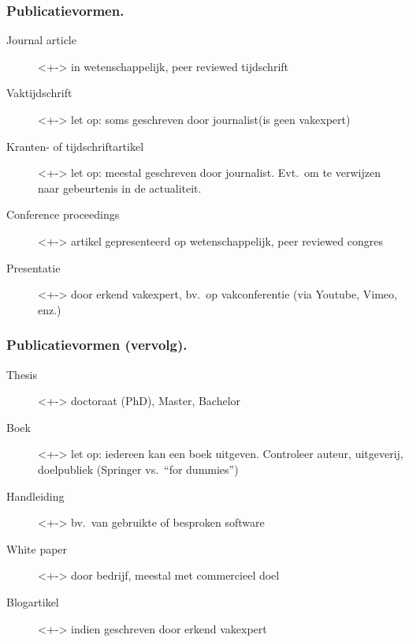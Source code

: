 \documentclass[aspectratio=169]{beamer}
\begin{document}
\begin{frame}
  \frametitle{Publicatievormen.}

  \begin{description}
    \item[Journal article]<+-> in wetenschappelijk, peer reviewed tijdschrift
    \item[Vaktijdschrift]<+-> let op: soms geschreven door journalist\linebreak(is geen vakexpert)
    \item[Kranten- of tijdschriftartikel] <+-> let op: meestal geschreven door journalist. Evt.~om te verwijzen naar gebeurtenis in de actualiteit.
      \item[Conference proceedings]<+-> artikel gepresenteerd op wetenschappelijk, peer reviewed congres
      \item[Presentatie]<+-> door erkend vakexpert, bv.\ op vakconferentie (via Youtube, Vimeo, enz.)
  \end{description}
\end{frame}

\begin{frame}
  \frametitle{Publicatievormen (vervolg).}

  \begin{description}
    \item[Thesis]<+-> doctoraat (PhD), Master, Bachelor
    \item[Boek]<+-> let op: iedereen kan een boek uitgeven. Controleer auteur, uitgeverij, doelpubliek (Springer vs.\ ``for dummies'')
    \item[Handleiding]<+-> bv.\ van gebruikte of besproken software
    \item[White paper]<+-> door bedrijf, meestal met commercieel doel
    \item[Blogartikel]<+-> indien geschreven door erkend vakexpert
  \end{description}
\end{frame}
\end{document}
